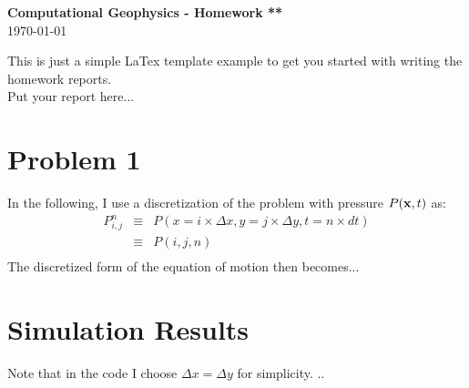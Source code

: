 \documentclass[11pt,titlepage,fleqn]{article}
\begin{document}
\begin{center}
\Large {\bf Computational Geophysics - Homework **}\\
\today
\end{center}

\vspace{3cm}

This is just a simple LaTex template example to get you started with writing the homework reports. \\

Put your report here...\\


\section*{Problem 1}

In the following, I use a discretization of the problem with pressure $P({\bf x},t)$ as:
\begin{eqnarray*}
P^n_{i,j}  	& \equiv & P(x=i \times \Delta x, y=j \times \Delta y, t=n \times dt) \\
 				& \equiv & P(i,j,n)\\
\end{eqnarray*}
The discretized form of the equation of motion then becomes...\\


\section*{Simulation Results}
Note that in the code I choose $\Delta x=\Delta y$ for simplicity. ..


\end{document}
